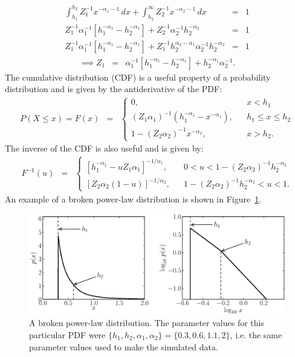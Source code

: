 \documentclass[manuscript]{aastex}
\begin{document}
\begin{eqnarray}
\int_{h_1}^{h_2} Z_1^{-1} x^{-\alpha_1 - 1} \, dx
+
\int_{h_2}^\infty Z_2^{-1} x^{-\alpha_2 - 1} \, dx
&=& 1 \\
Z_1^{-1}\alpha_1^{-1}\left[h_1^{-\alpha_1} - h_2^{-\alpha_1}\right]
+
Z_2^{-1}\alpha_2^{-1}h_2^{-\alpha_2}
&=& 1 \\
Z_1^{-1}\alpha_1^{-1}\left[h_1^{-\alpha_1} - h_2^{-\alpha_1}\right]
+
Z_1^{-1}h_2^{\alpha_2-\alpha_1}\alpha_2^{-1}h_2^{-\alpha_2}
&=& 1
\end{eqnarray}
\begin{eqnarray}
\implies
Z_1 &=& \alpha_1^{-1}\left[h_1^{-\alpha_1} - h_2^{-\alpha_1}\right]
+
h_2^{-\alpha_1}\alpha_2^{-1}.
\end{eqnarray}
The cumulative distribution (CDF) is a useful property of a probability
distribution and is given by the antiderivative of the PDF:
\begin{eqnarray}
P(X \leq x) = F(x) &=&
\left\{
\begin{array}{lcr}
0, & & x < h_1 \\
(Z_1\alpha_1)^{-1}\left(h_1^{-\alpha_1} - x^{-\alpha_1}\right), & & h_1 \leq x \leq h_2 \\
1 - (Z_2\alpha_2)^{-1}x^{-\alpha_2}, & & x > h_2.
\end{array}
\right.
\end{eqnarray}
The inverse of the CDF is also useful and is given by:
\begin{eqnarray}
F^{-1}(u) &=&
\left\{
\begin{array}{lcr}
\left[h_1^{-\alpha_1} - uZ_1\alpha_1\right]^{-1/\alpha_1}, & & 0 < u < 1 - (Z_2\alpha_2)^{-1}h_2^{-\alpha_2}\\
\left[Z_2\alpha_2(1-u)\right]^{-1/\alpha_2},& & 1 - (Z_2\alpha_2)^{-1}h_2^{-\alpha_2}< u < 1.
\end{array}
\right.
\end{eqnarray}
An example of a broken power-law distribution is shown in Figure~\ref{fig:powerlaw}.
\begin{figure}[ht!]
\begin{center}
\includegraphics[width=\textwidth]{Figures/broken.eps}
\caption{A broken power-law distribution. The parameter values for this
particular PDF were
$\{h_1, h_2, \alpha_1, \alpha_2\} = \{0.3, 0.6, 1.1, 2\}$, i.e. the same
parameter values used to make the simulated data.
\label{fig:powerlaw}}
\end{center}
\end{figure}
\end{document}
